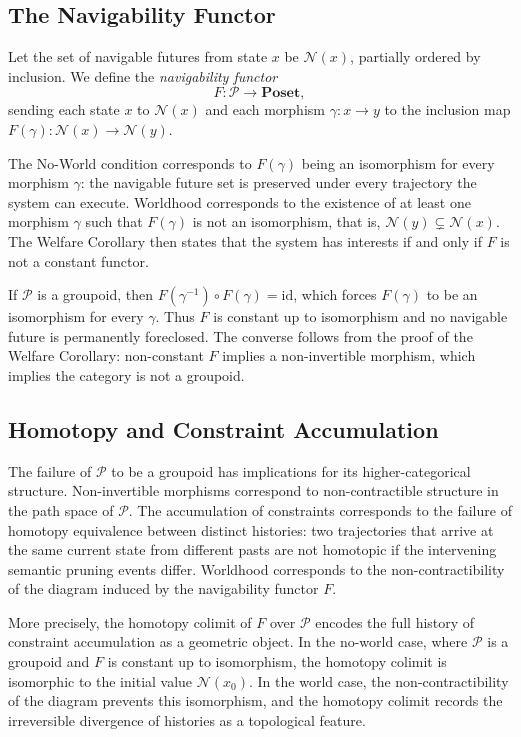 \documentclass[11pt]{article}
\theoremstyle{definition}
\theoremstyle{remark}
\begin{document}
\subsection{The Navigability Functor}

Let the set of navigable futures from state $x$ be $\mathcal{N}(x)$, partially ordered by
inclusion. We define the \emph{navigability functor}
\[
F: \mathcal{P} \to \mathbf{Poset},
\]
sending each state $x$ to $\mathcal{N}(x)$ and each morphism $\gamma: x \to y$ to the
inclusion map $F(\gamma): \mathcal{N}(x) \to \mathcal{N}(y)$.

The No-World condition corresponds to $F(\gamma)$ being an isomorphism for every morphism
$\gamma$: the navigable future set is preserved under every trajectory the system can execute.
Worldhood corresponds to the existence of at least one morphism $\gamma$ such that
$F(\gamma)$ is not an isomorphism, that is, $\mathcal{N}(y) \subsetneq \mathcal{N}(x)$.
The Welfare Corollary then states that the system has interests if and only if $F$ is not
a constant functor.

If $\mathcal{P}$ is a groupoid, then $F(\gamma^{-1}) \circ F(\gamma) = \mathrm{id}$, which
forces $F(\gamma)$ to be an isomorphism for every $\gamma$. Thus $F$ is constant up to
isomorphism and no navigable future is permanently foreclosed. The converse follows from
the proof of the Welfare Corollary: non-constant $F$ implies a non-invertible morphism,
which implies the category is not a groupoid.

\subsection{Homotopy and Constraint Accumulation}

The failure of $\mathcal{P}$ to be a groupoid has implications for its higher-categorical
structure. Non-invertible morphisms correspond to non-contractible structure in the path
space of $\mathcal{P}$. The accumulation of constraints corresponds to the failure of
homotopy equivalence between distinct histories: two trajectories that arrive at the same
current state from different pasts are not homotopic if the intervening semantic pruning
events differ. Worldhood corresponds to the non-contractibility of the diagram induced
by the navigability functor $F$.

More precisely, the homotopy colimit of $F$ over $\mathcal{P}$ encodes the full history
of constraint accumulation as a geometric object. In the no-world case, where $\mathcal{P}$
is a groupoid and $F$ is constant up to isomorphism, the homotopy colimit is isomorphic
to the initial value $\mathcal{N}(x_0)$. In the world case, the non-contractibility of
the diagram prevents this isomorphism, and the homotopy colimit records the irreversible
divergence of histories as a topological feature.
\end{document}
